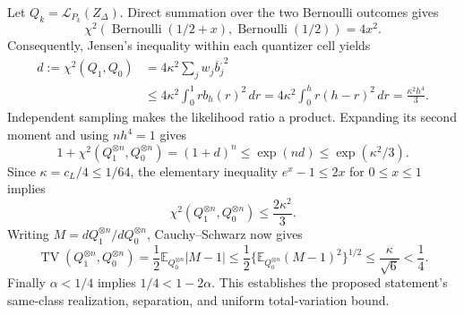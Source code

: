 Let \(Q_k=\mathcal L_{P_k}(Z_\Delta)\).  Direct summation over the two Bernoulli outcomes gives
\[
 \chi^2\!\left(\operatorname{Bernoulli}(1/2+x),
                    \operatorname{Bernoulli}(1/2)\right)=4x^2.
\]
Consequently, Jensen's inequality within each quantizer cell yields
\[
 \begin{aligned}
 d:=\chi^2(Q_1,Q_0)
 &=4\kappa^2\sum_jw_j\overline b_j^{,2}\\
 &\leq4\kappa^2\int_0^1rb_h(r)^2\,dr
 =4\kappa^2\int_0^h r(h-r)^2\,dr
 =\frac{\kappa^2h^4}{3}.
 \end{aligned}
\]
Independent sampling makes the likelihood ratio a product.  Expanding its second moment and using \(nh^4=1\) gives
\[
 1+\chi^2(Q_1^{\otimes n},Q_0^{\otimes n})
 =(1+d)^n
 \leq\exp(nd)
 \leq\exp(\kappa^2/3).
\]
Since \(\kappa=c_L/4\leq1/64\), the elementary inequality \(e^x-1\leq2x\) for \(0\leq x\leq1\) implies
\[
 \chi^2(Q_1^{\otimes n},Q_0^{\otimes n})
 \leq\frac{2\kappa^2}{3}.
\]
Writing \(M=dQ_1^{\otimes n}/dQ_0^{\otimes n}\), Cauchy--Schwarz now gives
\[
 \operatorname{TV}(Q_1^{\otimes n},Q_0^{\otimes n})
 =\frac12\mathbb E_{Q_0^{\otimes n}}|M-1|
 \leq\frac12\{\mathbb E_{Q_0^{\otimes n}}(M-1)^2\}^{1/2}
 \leq\frac{\kappa}{\sqrt6}<\frac14.
\]
Finally \(\alpha<1/4\) implies \(1/4<1-2\alpha\).  This establishes the proposed statement's same-class realization, separation, and uniform total-variation bound.